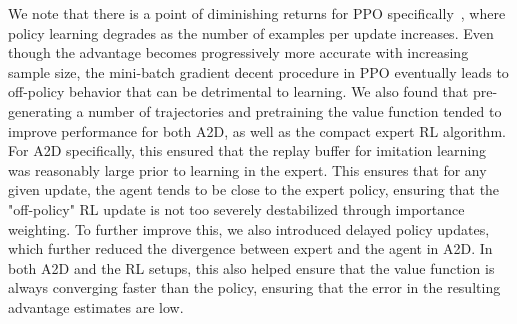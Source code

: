 We note that there is a point of diminishing returns for PPO specifically~\cite{Engstrom2020Implementation}, where policy learning degrades as the number of examples per update increases. Even though the advantage becomes progressively more accurate with increasing sample size, the mini-batch gradient decent procedure in PPO eventually leads to off-policy behavior that can be detrimental to learning.  We also found that pre-generating a number of trajectories and pretraining the value function tended to improve performance for both A2D, as well as the compact expert RL algorithm.  For A2D specifically, this ensured that the replay buffer for imitation learning was reasonably large prior to learning in the expert. This ensures that for any given update, the agent tends to be close to the expert policy, ensuring that the "off-policy" RL update is not too severely destabilized through importance weighting. To further improve this, we also introduced delayed policy updates, which further reduced the divergence between expert and the agent in A2D. In both A2D and the RL setups, this also helped ensure that the value function is always converging faster than the policy, ensuring that the error in the resulting advantage estimates are low.  

